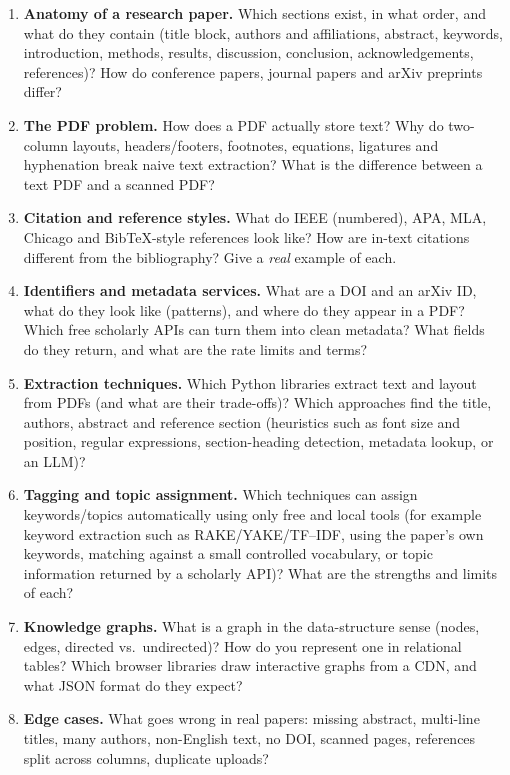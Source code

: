 \documentclass[11pt,a4paper]{article}
\begin{document}
\begin{enumerate}[label=\textbf{Q\arabic*.}]
\item \textbf{Anatomy of a research paper.} Which sections exist, in what order, and what do they contain (title block, authors and affiliations, abstract, keywords, introduction, methods, results, discussion, conclusion, acknowledgements, references)? How do conference papers, journal papers and arXiv preprints differ?
\item \textbf{The PDF problem.} How does a PDF actually store text? Why do two-column layouts, headers/footers, footnotes, equations, ligatures and hyphenation break naive text extraction? What is the difference between a text PDF and a scanned PDF?
\item \textbf{Citation and reference styles.} What do IEEE (numbered), APA, MLA, Chicago and BibTeX-style references look like? How are in-text citations different from the bibliography? Give a \emph{real} example of each.
\item \textbf{Identifiers and metadata services.} What are a DOI and an arXiv ID, what do they look like (patterns), and where do they appear in a PDF? Which free scholarly APIs can turn them into clean metadata? What fields do they return, and what are the rate limits and terms?
\item \textbf{Extraction techniques.} Which Python libraries extract text and layout from PDFs (and what are their trade-offs)? Which approaches find the title, authors, abstract and reference section (heuristics such as font size and position, regular expressions, section-heading detection, metadata lookup, or an LLM)?
\item \textbf{Tagging and topic assignment.} Which techniques can assign keywords/topics automatically using only free and local tools (for example keyword extraction such as RAKE/YAKE/TF--IDF, using the paper's own keywords, matching against a small controlled vocabulary, or topic information returned by a scholarly API)? What are the strengths and limits of each?
\item \textbf{Knowledge graphs.} What is a graph in the data-structure sense (nodes, edges, directed vs.\ undirected)? How do you represent one in relational tables? Which browser libraries draw interactive graphs from a CDN, and what JSON format do they expect?
\item \textbf{Edge cases.} What goes wrong in real papers: missing abstract, multi-line titles, many authors, non-English text, no DOI, scanned pages, references split across columns, duplicate uploads?
\end{enumerate}
\end{document}
